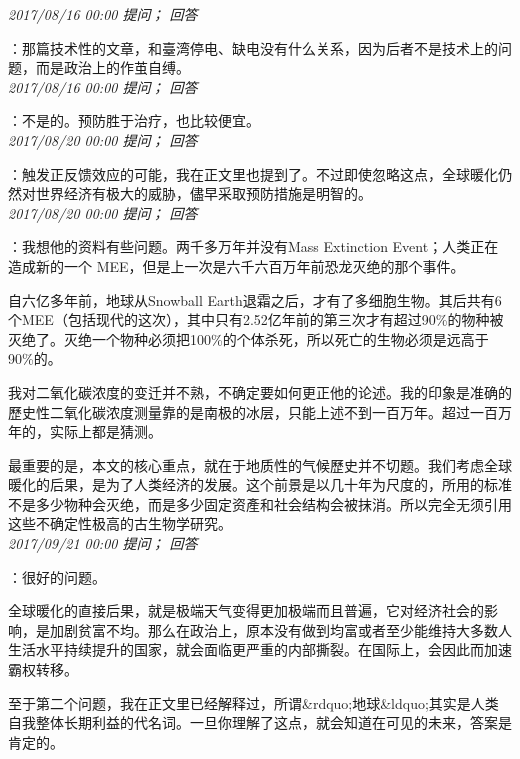 \documentclass[twocolumn]{ctexart}
\begin{document}
\textit{\hfill\noindent\small 2017/08/16 00:00 提问； 回答}

：那篇技术性的文章，和臺湾停电、缺电没有什么关系，因为后者不是技术上的问题，而是政治上的作茧自缚。\\

\textit{\hfill\noindent\small 2017/08/16 00:00 提问； 回答}

：不是的。预防胜于治疗，也比较便宜。\\

\textit{\hfill\noindent\small 2017/08/20 00:00 提问； 回答}

：触发正反馈效应的可能，我在正文里也提到了。不过即使忽略这点，全球暖化仍然对世界经济有极大的威胁，儘早采取预防措施是明智的。\\

\textit{\hfill\noindent\small 2017/08/20 00:00 提问； 回答}

：我想他的资料有些问题。两千多万年并没有Mass Extinction Event；人类正在造成新的一个 MEE，但是上一次是六千六百万年前恐龙灭绝的那个事件。

自六亿多年前，地球从Snowball Earth退霜之后，才有了多细胞生物。其后共有6个MEE（包括现代的这次），其中只有2.52亿年前的第三次才有超过90\%的物种被灭绝了。灭绝一个物种必须把100\%的个体杀死，所以死亡的生物必须是远高于90\%的。

我对二氧化碳浓度的变迁并不熟，不确定要如何更正他的论述。我的印象是准确的歷史性二氧化碳浓度测量靠的是南极的冰层，只能上述不到一百万年。超过一百万年的，实际上都是猜测。

最重要的是，本文的核心重点，就在于地质性的气候歷史并不切题。我们考虑全球暖化的后果，是为了人类经济的发展。这个前景是以几十年为尺度的，所用的标准不是多少物种会灭绝，而是多少固定资產和社会结构会被抹消。所以完全无须引用这些不确定性极高的古生物学研究。\\

\textit{\hfill\noindent\small 2017/09/21 00:00 提问； 回答}

：很好的问题。

全球暖化的直接后果，就是极端天气变得更加极端而且普遍，它对经济社会的影响，是加剧贫富不均。那么在政治上，原本没有做到均富或者至少能维持大多数人生活水平持续提升的国家，就会面临更严重的内部撕裂。在国际上，会因此而加速霸权转移。

至于第二个问题，我在正文里已经解释过，所谓\&rdquo;地球\&ldquo;其实是人类自我整体长期利益的代名词。一旦你理解了这点，就会知道在可见的未来，答案是肯定的。\\
\end{document}
